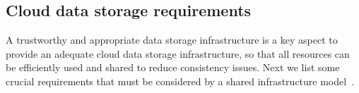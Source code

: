 \subsection{Cloud data storage requirements}
\label{sec:2.1}
A trustworthy and appropriate data storage infrastructure is a key aspect to %
{\al provide} an adequate cloud 
{\al data storage infrastructure,} 
so that all resources can be efficiently used and shared to reduce consistency issues. Next we list some crucial requirements that must be considered by a shared infrastructure model~\cite{Brewer2000, ju2011survey, rimal2009taxonomy}. \\

